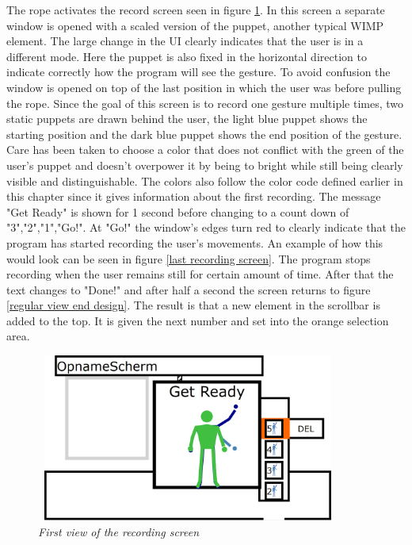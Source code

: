 The rope activates the record screen seen in figure \ref{first recording screen}. In this screen a separate window is opened with a scaled version of the puppet, another typical WIMP element. The large change in the UI clearly indicates that the user is in a different mode. Here the puppet is also fixed in the horizontal direction to indicate correctly how the program will see the gesture. To avoid confusion the window is opened on top of the last position in which the user was before pulling the rope. Since the goal of this screen is to record one gesture multiple times, two static puppets are drawn behind the user, the light blue puppet shows the starting position and the dark blue puppet shows the end position of the gesture. Care has been taken to choose a color that does not conflict with the green of the user's puppet and doesn't overpower it by being to bright while still being clearly visible and distinguishable. The colors also follow the color code defined earlier in this chapter since it gives information about the first recording. The message "Get Ready" is shown for 1 second before changing to a count down of "3","2","1","Go!". At "Go!" the window's edges turn red to clearly indicate that the program has started recording the user's movements. An example of how this would look can be seen in figure \ref{last recording screen}. The program stops recording when the user remains still for certain amount of time. After that the text changes to "Done!" and after half a second the screen returns to figure  \ref{regular view end design}. The result is that a new element in the scrollbar is added to the top. It is given the next number and set into the orange selection area.\\

\begin{figure}[H]
	\begin{center}
		\includegraphics[width=10cm, height=5.5cm]{figures/4_record_getready.png}
		\caption{\emph{First view of the recording screen}}
		\label{first recording screen}
	\end{center}
\end{figure}

